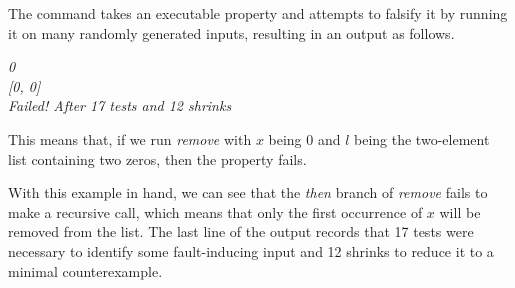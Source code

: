 The  command takes an executable property and attempts to falsify it by running it on many randomly generated inputs, resulting in an output as follows.

\begin{tabbing}
	\emph{0} \\
	\emph{[0, 0]} \\
	\emph{Failed! After 17 tests and 12 shrinks}
\end{tabbing}

This means that, if we run \emph{remove} with $ x $ being 0 and $ l $ being the two-element list containing two zeros, then the property  fails.

With this example in hand, we can see that the \emph{then} branch of \emph{remove} fails to make a recursive call, which means that only the first occurrence of $ x $ will be removed from the list. The last line of the output records that 17 tests were necessary to identify some fault-inducing input and 12 shrinks to reduce it to a minimal counterexample.


